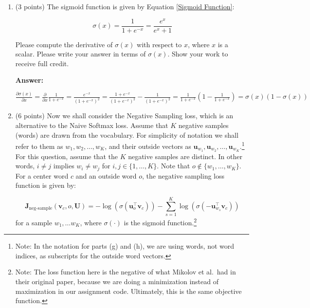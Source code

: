 \documentclass{article}
\newenvironment{answer}{
    {\bf Answer:} \sf \begingroup\color{red}
}{\endgroup}%
\begin{document}
\begin{enumerate}[label=(\alph*)]
\begin{shaded}
\begin{answer}
$\frac{\partial f(x)}{\partial x} = \begin{cases}
        1 & \text{if } x > 0\\
        0 & \text{if } x < 0
    \end{cases}$
\end{answer}
\end{shaded}

\item (3 points) The sigmoid function is given by Equation \ref{Sigmoid Function}:

\begin{equation}
    \label{Sigmoid Function}
    \sigma (x) = \frac{1}{1 + e^{-x}} = \frac{e^{x}}{e^{x} + 1}
\end{equation}

Please compute the derivative of $\sigma(x)$ with respect to $x$, where $x$ is a scalar. Please write your answer in terms of $\sigma(x)$. Show your work to receive full credit.

\begin{shaded}
\begin{answer}
$\frac{\partial \sigma (x)}{\partial x} 
= \frac{\partial}{\partial x} \frac{1}{1 + e^{-x}}
= \frac{e^{-x}}{(1 + e^{-x})^2}
= \frac{1 + e^{-x}}{(1 + e^{-x})^2} - \frac{1}{(1 + e^{-x})^2}
= \frac{1}{1 + e^{-x}}(1-\frac{1}{1 + e^{-x}})
= \sigma (x) (1-\sigma (x))$
\end{answer}
\end{shaded}

\item (6 points) Now we shall consider the Negative Sampling loss, which is an alternative to the Naive Softmax loss.  Assume that $K$ negative samples (words) are drawn from the vocabulary. For simplicity of notation we shall refer to them as $w_1, w_2, \dots, w_K$, and their outside vectors as $\bm u_{w_1}, \bm u_{w_2}, \dots, \bm u_{w_K}$.\footnote{Note: In the notation for parts (g) and (h), we are using words, not word indices, as subscripts for the outside word vectors.} For this question, assume that the $K$ negative samples are distinct. In other words, $i\neq j$ implies $w_i\neq w_j$ for $i,j\in\{1,\dots,K\}$.
Note that $o\notin\{w_1, \dots, w_K\}$. 
For a center word $c$ and an outside word $o$, the negative sampling loss function is given by:

\begin{equation}
\bm J_{\text{neg-sample}}(\bm v_c, o, \bm U) = -\log(\sigma(\bm u_o^\top \bm v_c)) - \sum_{s=1}^K \log(\sigma(-\bm u_{w_s}^\top \bm v_c))
\end{equation}
for a sample $w_1, \ldots w_K$, where $\sigma(\cdot)$ is the sigmoid function.\footnote{Note: The loss function here is the negative of what Mikolov et al.\ had in their original paper, because we are doing a minimization instead of maximization in our assignment code. Ultimately, this is the same objective function.}


\end{enumerate}
\end{document}
